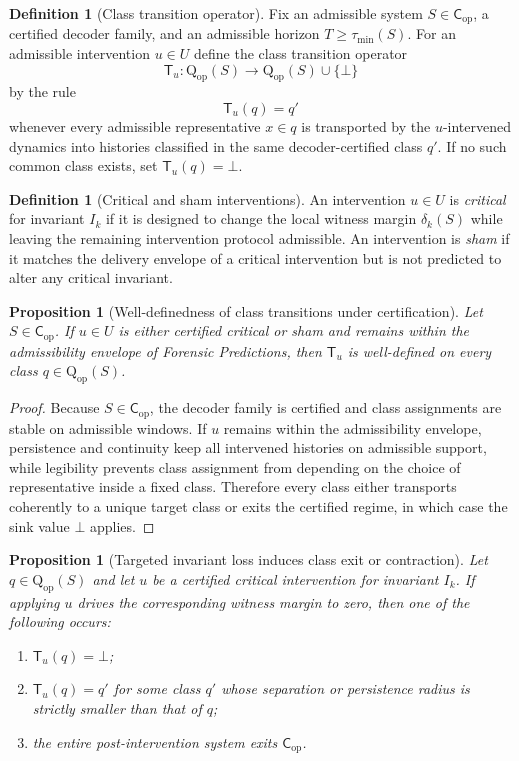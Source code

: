 \documentclass[11pt,a4paper]{article}
\newtheorem{proposition}[theorem]{Proposition}
\theoremstyle{definition}
\newtheorem{definition}[theorem]{Definition}
\newcommand{\Cop}{\mathsf{C}_{\mathrm{op}}}
\newcommand{\Qop}{\mathrm{Q}_{\mathrm{op}}}
\begin{document}
\begin{definition}[Class transition operator]\label{def:transition}
Fix an admissible system $S \in \Cop$, a certified decoder family, and an admissible horizon $T \ge \tau_{\min}(S)$. For an admissible intervention $u \in U$ define the class transition operator
\[
\mathsf{T}_u : \Qop(S) \to \Qop(S) \cup \{\bot\}
\]
by the rule
\[
\mathsf{T}_u(q)=q'
\]
whenever every admissible representative $x \in q$ is transported by the $u$-intervened dynamics into histories classified in the same decoder-certified class $q'$. If no such common class exists, set $\mathsf{T}_u(q)=\bot$.
\end{definition}

\begin{definition}[Critical and sham interventions]\label{def:critical-sham}
An intervention $u \in U$ is \emph{critical} for invariant $I_k$ if it is designed to change the local witness margin $\delta_k(S)$ while leaving the remaining intervention protocol admissible. An intervention is \emph{sham} if it matches the delivery envelope of a critical intervention but is not predicted to alter any critical invariant.
\end{definition}

\begin{proposition}[Well-definedness of class transitions under certification]\label{prop:transition-well}
Let $S \in \Cop$. If $u \in U$ is either certified critical or sham and remains within the admissibility envelope of \textit{Forensic Predictions}, then $\mathsf{T}_u$ is well-defined on every class $q \in \Qop(S)$.
\end{proposition}

\begin{proof}
Because $S \in \Cop$, the decoder family is certified and class assignments are stable on admissible windows. If $u$ remains within the admissibility envelope, persistence and continuity keep all intervened histories on admissible support, while legibility prevents class assignment from depending on the choice of representative inside a fixed class. Therefore every class either transports coherently to a unique target class or exits the certified regime, in which case the sink value $\bot$ applies.
\end{proof}

\begin{proposition}[Targeted invariant loss induces class exit or contraction]\label{prop:transition-rupture}
Let $q \in \Qop(S)$ and let $u$ be a certified critical intervention for invariant $I_k$. If applying $u$ drives the corresponding witness margin to zero, then one of the following occurs:
\begin{enumerate}[leftmargin=1.5em]
\item $\mathsf{T}_u(q)=\bot$;
\item $\mathsf{T}_u(q)=q'$ for some class $q'$ whose separation or persistence radius is strictly smaller than that of $q$;
\item the entire post-intervention system exits $\Cop$.
\end{enumerate}
\end{proposition}
\end{document}
